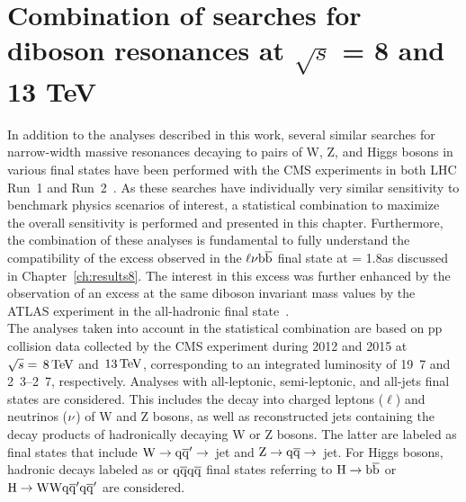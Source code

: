 \chapter{Combination of searches for diboson resonances at $\sqrt{s}$ = 8 and 13 TeV}
\label{ch:combination}

In addition to the analyses described in this work, several similar searches for narrow-width massive resonances decaying to pairs of W, Z, and Higgs bosons in various final states have been performed with the CMS experiments in both LHC Run~1 and Run~2~\cite{CMS-PAS-EXO-15-002,Khachatryan:2016cfx,Khachatryan:2014gha, Khachatryan:2014hpa, Khachatryan:2015bma, Khachatryan:2014xja,Khachatryan:2016yji,Khachatryan:2015ywa}.
As these searches have individually very similar sensitivity to benchmark physics scenarios of interest, a statistical combination to maximize the overall sensitivity is performed and presented in this chapter.
Furthermore, the combination of these analyses is fundamental to fully understand the compatibility of the excess observed in the $\ell\nu{\mathrm{b}\overline{\mathrm{b}}}$ final state at \mWH = 1.8\TeV as discussed in Chapter~\ref{ch:results8}.
The interest in this excess was further enhanced by the observation of an excess at the same diboson invariant mass values by the ATLAS experiment in the all-hadronic final state~\cite{Aad:2015owa}.\\

The analyses taken into account in the statistical combination are based on pp collision data collected by the CMS experiment during 2012 and 2015 at $\sqrt{s} = \text{\,8}{\ensuremath{\,\text{Te\hspace{-.08em}V}}}$ and $\text{\,13}{\ensuremath{\,\text{Te\hspace{-.08em}V}}}$, corresponding to an integrated luminosity of \unit{19.7}{\fbinv} and \unit{2.3}--\unit{2.7}{\fbinv}, respectively.
Analyses with all-leptonic, semi-leptonic, and all-jets final states are considered. This includes the decay into charged leptons ($\ell$) and neutrinos ($\nu$) of W and Z bosons, as well as reconstructed jets containing the decay products of hadronically decaying W or Z bosons. The latter are labeled as \qqbar final states that include $\rm W\to\mathrm{q}\overline{\mathrm{q}}'\to$~jet and $\rm Z\to\mathrm{q}\overline{\mathrm{q}}\to$~jet. For Higgs bosons, hadronic decays labeled as \bbbar or $\mathrm{q}\overline{\mathrm{q}}\mathrm{q}\overline{\mathrm{q}}$ final states referring to $\rm H\to{\mathrm{b}\overline{\mathrm{b}}}$ or $\rm H\to\mathrm{W}\mathrm{W}\mathrm{q}\overline{\mathrm{q}}^\prime\mathrm{q}\overline{\mathrm{q}}^\prime$ are considered.

